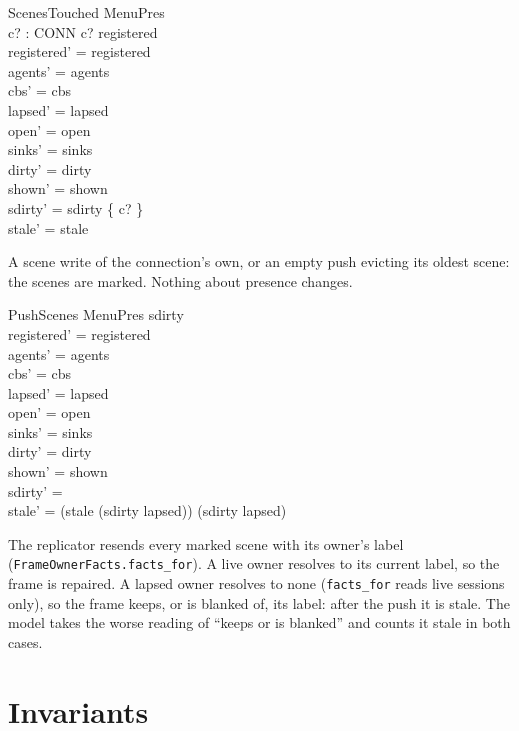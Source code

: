 \documentclass[a4paper,10pt,fleqn]{article}
\begin{document}
\begin{schema}{ScenesTouched}
  \Delta MenuPres \\
  c? : CONN
\where
  c? \in registered \\
  registered' = registered \\
  agents' = agents \\
  cbs' = cbs \\
  lapsed' = lapsed \\
  open' = open \\
  sinks' = sinks \\
  dirty' = dirty \\
  shown' = shown \\
  sdirty' = sdirty \cup \{ c? \} \\
  stale' = stale
\end{schema}

A scene write of the connection's own, or an empty push evicting its oldest
scene: the scenes are marked. Nothing about presence changes.

\begin{schema}{PushScenes}
  \Delta MenuPres
\where
  sdirty \neq \emptyset \\
  registered' = registered \\
  agents' = agents \\
  cbs' = cbs \\
  lapsed' = lapsed \\
  open' = open \\
  sinks' = sinks \\
  dirty' = dirty \\
  shown' = shown \\
  sdirty' = \emptyset \\
  stale' = (stale \setminus (sdirty \setminus lapsed)) \cup (sdirty \cap lapsed)
\end{schema}

The replicator resends every marked scene with its owner's label
(\texttt{FrameOwnerFacts.facts\_for}). A live owner resolves to its current
label, so the frame is repaired. A lapsed owner resolves to none
(\texttt{facts\_for} reads live sessions only), so the frame keeps, or is
blanked of, its label: after the push it is stale. The model takes the worse
reading of ``keeps or is blanked'' and counts it stale in both cases.

\section{Invariants}
\label{sec:inv}
\end{document}

